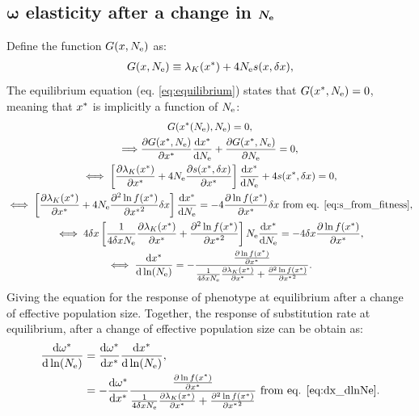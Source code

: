 \documentclass{article}
\begin{document}
\subsection{$\bm{\omega}$ elasticity after a change in $\bm{N_{\mathrm{e}}}$}
Define the function $G(x, N_{\mathrm{e}} )$ as:
\begin{gather}
G(x, N_{\mathrm{e}} ) \equiv \lambda_K (x^{*}) + 4 N_{\mathrm{e}} s(x, \delta x), 
\end{gather}
The equilibrium equation (eq. \ref{eq:equilibrium}) states that $G(x^{*}, N_{\mathrm{e}} )=0$, meaning that $x^{*}$ is implicitly a function of $N_{\mathrm{e}}$:
\begin{gather}
G(x^{*}(N_{\mathrm{e}}), N_{\mathrm{e}} ) = 0, \\
\Longrightarrow \frac{\partial G(x^{*}, N_{\mathrm{e}} ) }{\partial x^{*} }\frac{ \mathrm{d} x^{*}}{\mathrm{d} N_{\mathrm{e}}} + \frac{ \partial G(x^{*}, N_{\mathrm{e}} )}{\partial N_{\mathrm{e}}} = 0, \\
\iff \left[  \frac{\partial \lambda_K (x^{*}) }{\partial x^{*} }  + 4 N_{\mathrm{e}} \frac{ \partial s(x^{*}, \delta x) }{\partial x^{*} } \right]\frac{ \mathrm{d} x^{*}}{\mathrm{d} N_{\mathrm{e}}} + 4 s(x^{*}, \delta x) = 0, \\
\iff \left[  \frac{\partial \lambda_K (x^{*}) }{\partial x^{*} } + 4 N_{\mathrm{e}} \frac{ \partial^2 \ln f(x^{*}) }{\partial {x^{*}}^2}\delta x \right]\frac{ \mathrm{d} x^{*}}{\mathrm{d} N_{\mathrm{e}}}  = - 4 \frac{ \partial \ln f(x^{*}) }{\partial {x^{*}}}\delta x \text{ from eq. \ref{eq:s_from_fitness}}, \\
\iff 4 \delta x \left[ \frac{1}{4 \delta x N_{\mathrm{e}} } \frac{\partial \lambda_K (x^{*}) }{\partial x^{*} } + \frac{ \partial^2 \ln f(x^{*}) }{\partial {x^{*}}^2} \right] N_{\mathrm{e}} \frac{ \mathrm{d} x^{*}}{\mathrm{d} N_{\mathrm{e}}}  = - 4 \delta x \frac{ \partial \ln f(x^{*}) }{\partial {x^{*}}}, \\
\iff \frac{ \mathrm{d} x^{*}}{\mathrm{d} \ln (N_{\mathrm{e}})}  = - \frac{\frac{ \partial \ln f(x^{*}) }{\partial {x^{*}}}}{\frac{1}{4 \delta x N_{\mathrm{e}}} \frac{\partial \lambda_K (x^{*}) }{\partial x^{*} } + \frac{ \partial^2 \ln f(x^{*}) }{\partial {x^{*}}^2}}  \label{eq:dx_dlnNe}.
\end{gather}
Giving the equation for the response of phenotype at equilibrium after a change of effective population size.
Together, the response of substitution rate at equilibrium, after a change of effective population size can be obtain as:
\begin{align}
\frac{\mathrm{d} \omega^{*}}{\mathrm{d} \ln (N_{\mathrm{e}})} & = \frac{\mathrm{d} \omega^{*}}{\mathrm{d} x^{*}} \frac{ \mathrm{d} x^{*}}{\mathrm{d} \ln (N_{\mathrm{e}})}, \\
 &= - \frac{\mathrm{d} \omega^{*}}{\mathrm{d} x^{*}} \frac{\frac{ \partial \ln f(x^{*}) }{\partial {x^{*}}}}{\frac{1}{4 \delta x N_{\mathrm{e}} } \frac{\partial \lambda_K (x^{*}) }{\partial x^{*} } + \frac{ \partial^2 \ln f(x^{*}) }{\partial {x^{*}}^2}} \text{ from eq. \ref{eq:dx_dlnNe}} \label{eq:dw_dlnNe}.
\end{align}
\end{document}
